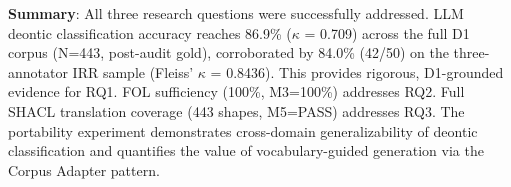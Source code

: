 \textbf{Summary}: All three research questions were successfully addressed. LLM deontic classification accuracy reaches 86.9\% ($\kappa$ = 0.709) across the full D1 corpus (N=443, post-audit gold), corroborated by 84.0\% (42/50) on the three-annotator IRR sample (Fleiss' $\kappa$ = 0.8436). This provides rigorous, D1-grounded evidence for RQ1. FOL sufficiency (100\%, M3=100\%) addresses RQ2. Full SHACL translation coverage (443 shapes, M5=PASS) addresses RQ3. The portability experiment demonstrates cross-domain generalizability of deontic classification and quantifies the value of vocabulary-guided generation via the Corpus Adapter pattern.
